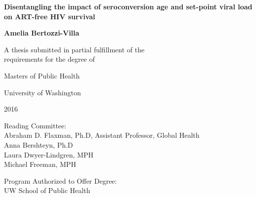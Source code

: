 \begin{titlepage}
    \singlespace
    \begin{center}
        \vspace*{1cm}
        
        \textbf{Disentangling the impact of seroconversion age and set-point viral load on ART-free HIV survival}
        
        \vspace{1.5cm}
        
        \textbf{Amelia Bertozzi-Villa}
        
        \vfill
        
        A thesis submitted in partial fulfillment of the\\
        requirements for the degree of 

        \vspace{0.5cm}

        Masters of Public Health

        \vspace{0.2cm}

        University of Washington
        
        \vspace{0.2cm}

        2016

        \vspace{0.5cm}

        Reading Committee: \\
        Abraham D. Flaxman, Ph.D, Assistant Professor, Global Health\\
        Anna Bershteyn, Ph.D \\
        Laura Dwyer-Lindgren, MPH \\
        Michael Freeman, MPH \\

        \vspace{1.0cm}

        Program Authorized to Offer Degree:\\
        UW School of Public Health
        
    \end{center}
\end{titlepage}